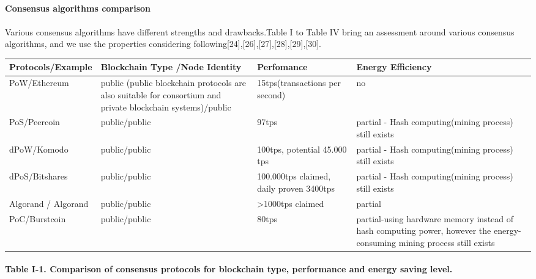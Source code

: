 \documentclass[doublespacing]{bmcart}
\begin{document}
\begin{CJK*}{UTF8}{gbsn}
\paragraph{Consensus algorithms comparison} 
\paragraph{}
Various consensus algorithms have different strengths and drawbacks.Table I to Table IV bring an assessment around various consensus algorithms, and we use the properties considering following[24],[26],[27],[28],[29],[30]. \newline
\begin{tabular}{p{2cm}p{3cm}p{3cm}p{3cm}}
\hline
Protocols/E\-xample & Blockchain Type \newline /Node Identity & Perfo\-mance & Energy Efficiency \\ \hline
PoW/Ethereum  & public \newline(public blockchain protocols are also suitable for consortium and private blockchain systems)/public  & 15tps(trans\-actions per second) & no \\ \hline
PoS/Peercoin & public/public & 97tps & partial - Hash computing(mining process) still exists \\ \hline
dPoW/Komodo & public/public & 100tps, potential 45.000 tps & partial - Hash computing(mining process) still exists \\ \hline
dPoS/\newline Bitshares & public/public & 100.000tps claimed, daily proven 3400tps & partial - Hash computing(mining process) still exists \\ \hline
Algorand / Algorand & public/public & \textgreater1000tps claimed & partial  \\ \hline
PoC/Burstcoin & public/public & 80tps & partial-using hardware memory instead of hash computing power, however the energy-consuming mining process still exists \\ \hline
\end{tabular}
\paragraph{Table I-1. Comparison of consensus protocols for blockchain type, performance and energy saving level.}


\end{CJK*}
\end{document}
